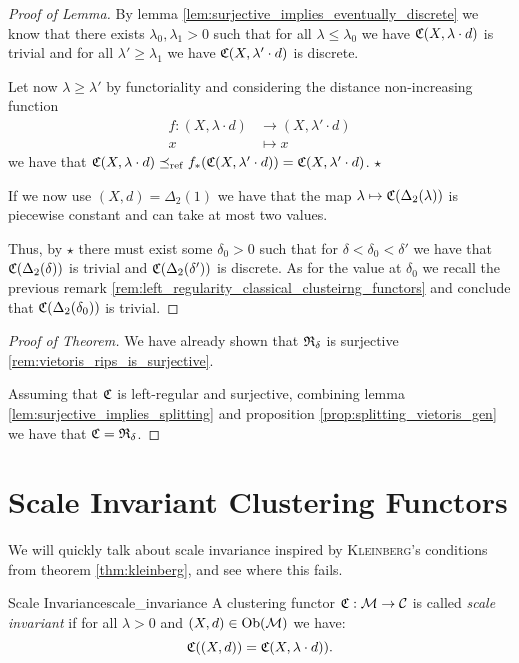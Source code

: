 \begin{proof}[Proof of Lemma]
    By lemma \ref{lem:surjective_implies_eventually_discrete} we know that there exists $\lambda_0, \lambda_1 > 0$ such that for all $\lambda \le \lambda_0$ we have $\mathfrak{C}(X, \lambda \cdot d)$ is trivial and for all $\lambda' \ge \lambda_1$ we have $\mathfrak{C}(X, \lambda' \cdot d)$ is discrete.

    Let now $\lambda \ge \lambda'$ by functoriality and considering the distance non-increasing function
    \begin{align*}
        f: (X, \lambda \cdot d) &\longrightarrow (X, \lambda' \cdot d)\\
        x &\longmapsto x
    \end{align*}
    we have that $\mathfrak{C}(X, \lambda \cdot d) \preceq_\mathrm{ref} f_*(\mathfrak{C}(X, \lambda' \cdot d)) = \mathfrak{C}(X, \lambda' \cdot d)$. $\star$

    If we now use $(X,d) = \Delta_2(1)$ we have that the map $\lambda \mapsto \mathfrak{C}(\Delta_2(\lambda))$ is piecewise constant and can take at most two values.

    Thus, by $\star$ there must exist some $\delta_0 > 0$ such that for $\delta < \delta_0 < \delta'$ we have that $\mathfrak{C}(\Delta_2(\delta))$ is trivial and $\mathfrak{C}(\Delta_2(\delta'))$ is discrete.
    As for the value at $\delta_0$ we recall the previous remark \ref{rem:left_regularity_classical_clusteirng_functors} and conclude that $\mathfrak{C}(\Delta_2(\delta_0))$ is trivial.
\end{proof}

\begin{proof}[Proof of Theorem]
    We have already shown that $\mathfrak{R}_\delta$ is surjective \ref{rem:vietoris_rips_is_surjective}.

    Assuming that $\mathfrak{C}$ is left-regular and surjective, combining lemma \ref{lem:surjective_implies_splitting} and proposition \ref{prop:splitting_vietoris_gen} we have that $\mathfrak{C} = \mathfrak{R}_{\delta}$.
\end{proof}

\section{Scale Invariant Clustering Functors}

We will quickly talk about scale invariance inspired by \textsc{Kleinberg}'s conditions from theorem \ref{thm:kleinberg}, and see where this fails. \source

\begin{definition}{Scale Invariance}{scale_invariance}
    A clustering functor $\mathfrak{C}: \mathcal{M} \to \mathcal{C}$ is called \emph{scale invariant} if for all $\lambda > 0$ and $(X,d) \in \mathrm {Ob}(\mathcal{M})$ we have:
    \begin{equation*}
        \mathfrak{C}((X,d)) = \mathfrak{C}(X,\lambda \cdot d)).
    \end{equation*}
\end{definition}

